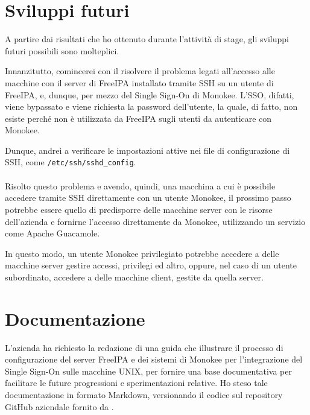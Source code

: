 \section{Sviluppi futuri}
A partire dai risultati che ho ottenuto durante l'attività di stage, gli sviluppi futuri possibili sono molteplici.

Innanzitutto, comincerei con il risolvere il problema legati all'accesso alle macchine con il server di FreeIPA installato tramite SSH su un utente di FreeIPA, e, dunque, per mezzo del Single Sign-On di Monokee. L'SSO, difatti, viene bypassato e viene richiesta la password dell'utente, la quale, di fatto, non esiste perché non è utilizzata da FreeIPA sugli utenti da autenticare con Monokee. 

Dunque, andrei a verificare le impostazioni attive nei file di configurazione di SSH, come \texttt{/etc/ssh/sshd\_config}.
\\ \\
Risolto questo problema e avendo, quindi, una macchina a cui è possibile accedere tramite SSH direttamente con un utente Monokee, il prossimo passo potrebbe essere quello di predisporre delle macchine server con le risorse dell'azienda e fornirne l'accesso 
direttamente da Monokee, utilizzando un servizio come Apache Guacamole.

In questo modo, un utente Monokee privilegiato potrebbe accedere a delle macchine server gestire accessi, privilegi ed altro, oppure, nel caso di un utente subordinato, accedere a delle macchine client, gestite da quella server.
\section{Documentazione}

L'azienda ha richiesto la redazione di una guida che illustrare il processo di configurazione del server FreeIPA e dei sistemi di Monokee per l'integrazione del Single Sign-On sulle macchine UNIX, per fornire una base documentativa per facilitare le future progressioni e sperimentazioni relative. Ho steso tale documentazione in formato Markdown, versionando il codice sul repository GitHub aziendale fornito da \myAzienda.